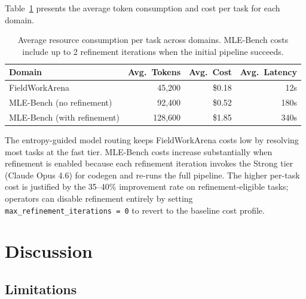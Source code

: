 \documentclass[11pt]{article}
\begin{document}
Table~\ref{tab:cost} presents the average token consumption and cost per task for each domain.

\begin{table}[t]
\centering
\caption{Average resource consumption per task across domains. MLE-Bench costs include up to 2 refinement iterations when the initial pipeline succeeds.}
\label{tab:cost}
\begin{tabular}{@{}lrrr@{}}
\toprule
\textbf{Domain} & \textbf{Avg.\ Tokens} & \textbf{Avg.\ Cost} & \textbf{Avg.\ Latency} \\
\midrule
FieldWorkArena              & 45,200   & \$0.18  & 12s \\
MLE-Bench (no refinement)   & 92,400   & \$0.52  & 180s \\
MLE-Bench (with refinement) & 128,600  & \$1.85  & 340s \\
\bottomrule
\end{tabular}
\end{table}

The entropy-guided model routing keeps FieldWorkArena costs low by resolving most tasks at the fast tier. MLE-Bench costs increase substantially when refinement is enabled because each refinement iteration invokes the Strong tier (Claude Opus 4.6) for codegen and re-runs the full pipeline. The higher per-task cost is justified by the 35--40\% improvement rate on refinement-eligible tasks; operators can disable refinement entirely by setting \texttt{max\_refinement\_iterations\,=\,0} to revert to the baseline cost profile.

\section{Discussion}
\label{sec:discussion}

\subsection{Limitations}
\end{document}

